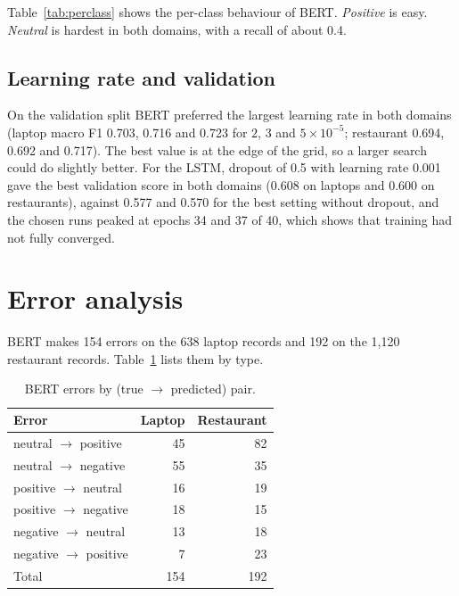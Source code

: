 \documentclass{nle}
\begin{document}
Table~\ref{tab:perclass} shows the per-class behaviour of BERT. \textit{Positive} is easy. \textit{Neutral} is hardest in both domains, with a recall of about 0.4.

\subsection{Learning rate and validation}

On the validation split BERT preferred the largest learning rate in both domains (laptop macro F1 0.703, 0.716 and 0.723 for $2$, $3$ and $5\times10^{-5}$; restaurant 0.694, 0.692 and 0.717). The best value is at the edge of the grid, so a larger search could do slightly better. For the LSTM, dropout of 0.5 with learning rate 0.001 gave the best validation score in both domains (0.608 on laptops and 0.600 on restaurants), against 0.577 and 0.570 for the best setting without dropout, and the chosen runs peaked at epochs 34 and 37 of 40, which shows that training had not fully converged.

\section{Error analysis}

BERT makes 154 errors on the 638 laptop records and 192 on the 1,120 restaurant records. Table~\ref{tab:errors} lists them by type.

\begin{table}
\caption{BERT errors by (true $\rightarrow$ predicted) pair.}
\label{tab:errors}
\begin{minipage}{\textwidth}
\begin{tabular}{lrr}
\hline\hline
Error & Laptop & Restaurant\\
\hline
neutral $\rightarrow$ positive & 45 & 82\\
neutral $\rightarrow$ negative & 55 & 35\\
positive $\rightarrow$ neutral & 16 & 19\\
positive $\rightarrow$ negative & 18 & 15\\
negative $\rightarrow$ neutral & 13 & 18\\
negative $\rightarrow$ positive & 7 & 23\\
\hline
Total & 154 & 192\\
\hline\hline
\end{tabular}
\vspace{-2\baselineskip}
\end{minipage}
\end{table}
\end{document}
